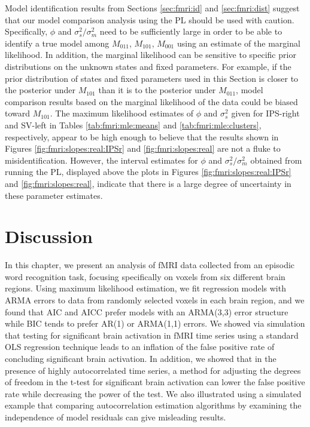 Model identification results from Sections \ref{sec:fmri:id} and \ref{sec:fmri:dist} suggest that our model comparison analysis using the PL should be used with caution. Specifically, $\phi$ and $\sigma^2_s / \sigma^2_m$ need to be sufficiently large in order to be able to identify a true model among $M_{011}$, $M_{101}$, $M_{001}$ using an estimate of the marginal likelihood. In addition, the marginal likelihood can be sensitive to specific prior distributions on the unknown states and fixed parameters. For example, if the prior distribution of states and fixed parameters used in this Section is closer to the posterior under $M_{101}$ than it is to the posterior under $M_{011}$, model comparison results based on the marginal likelihood of the data could be biased toward $M_{101}$. The maximum likelihood estimates of $\phi$ and $\sigma^2_s$ given for IPS-right and SV-left in Tables \ref{tab:fmri:mle:means} and \ref{tab:fmri:mle:clusters}, respectively, appear to be high enough to believe that the results shown in Figures \ref{fig:fmri:slopes:real:IPSr} and \ref{fig:fmri:slopes:real} are not a fluke to misidentification. However, the interval estimates for $\phi$ and $\sigma^2_s / \sigma^2_m$ obtained from running the PL, displayed above the plots in Figures \ref{fig:fmri:slopes:real:IPSr} and \ref{fig:fmri:slopes:real}, indicate that there is a large degree of uncertainty in these parameter estimates.

\section{Discussion \label{sec:fmri:discussion}}

In this chapter, we present an analysis of fMRI data collected from an episodic word recognition task, focusing specifically on voxels from six different brain regions. Using maximum likelihood estimation, we fit regression models with ARMA errors to data from randomly selected voxels in each brain region, and we found that AIC and AICC prefer models with an ARMA(3,3) error structure while BIC tends to prefer AR(1) or ARMA(1,1) errors. We showed via simulation that testing for significant brain activation in fMRI time series using a standard OLS regression technique leads to an inflation of the false positive rate of concluding significant brain activation. In addition, we showed that in the presence of highly autocorrelated time series, a method for adjusting the degrees of freedom in the t-test for significant brain activation can lower the false positive rate while decreasing the power of the test. We also illustrated using a simulated example that comparing autocorrelation estimation algorithms by examining the independence of model residuals can give misleading results.

